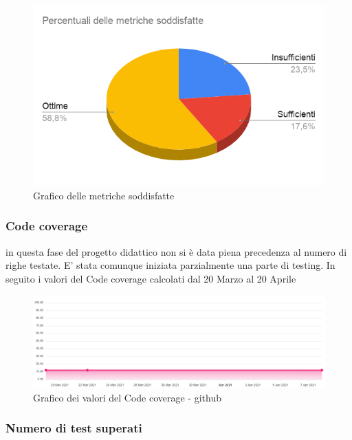         \begin{figure}[H]
            \centering
            \includegraphics[width=14 cm]{source/sections/images/percentuale-metriche-soddisfatte.png}
            \caption{Grafico delle metriche soddisfatte}
        \end{figure}

\subsubsection{Code coverage}
    in questa fase del progetto didattico non si è data piena precedenza al numero di righe testate. E' stata comunque
    iniziata parzialmente una parte di testing. In seguito i valori del Code coverage calcolati dal 20 Marzo al 20 Aprile
    \begin{figure}[H]
        \centering
        \includegraphics[width=16 cm]{source/sections/images/CodeCoverage.png}
        \caption{Grafico dei valori del Code coverage - github}
    \end{figure}


\subsubsection{Numero di test superati}

